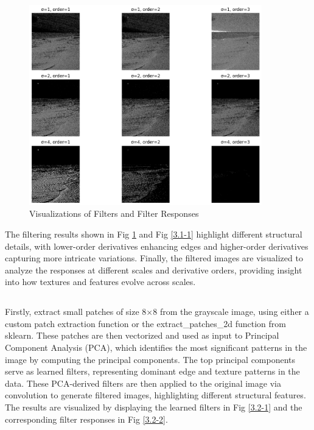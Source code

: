\documentclass[12pt]{article}
\begin{document}
\begin{figure}[h]
    \centering
    \includegraphics[width=0.9\textwidth]{pics/a6_3.1.png}
    \caption{Visualizations of Filters and Filter Responses}
    \label{3.1}
\end{figure}

The filtering results shown in Fig \ref{3.1} and Fig \ref{3.1-1} highlight different structural details, with lower-order derivatives enhancing edges and higher-order derivatives capturing more intricate variations. Finally, the filtered images are visualized to analyze the responses at different scales and derivative orders, providing insight into how textures and features evolve across scales.

\subsection{}
Firstly, extract small patches of size 8×8 from the grayscale image, using either a custom patch extraction function or the extract\_patches\_2d function from sklearn. These patches are then vectorized and used as input to Principal Component Analysis (PCA), which identifies the most significant patterns in the image by computing the principal components. The top principal components serve as learned filters, representing dominant edge and texture patterns in the data. These PCA-derived filters are then applied to the original image via convolution to generate filtered images, highlighting different structural features. The results are visualized by displaying the learned filters in Fig \ref{3.2-1} and the corresponding filter responses in Fig \ref{3.2-2}.
\end{document}
